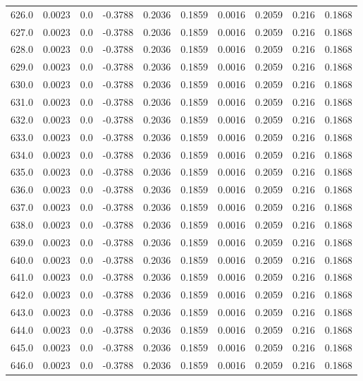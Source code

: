 \begin{longtable}{lrrrrrrrrr}
626.0 & 0.0023 & 0.0 & -0.3788 & 0.2036 & 0.1859 & 0.0016 & 0.2059 & 0.216 & 0.1868 \\
627.0 & 0.0023 & 0.0 & -0.3788 & 0.2036 & 0.1859 & 0.0016 & 0.2059 & 0.216 & 0.1868 \\
628.0 & 0.0023 & 0.0 & -0.3788 & 0.2036 & 0.1859 & 0.0016 & 0.2059 & 0.216 & 0.1868 \\
629.0 & 0.0023 & 0.0 & -0.3788 & 0.2036 & 0.1859 & 0.0016 & 0.2059 & 0.216 & 0.1868 \\
630.0 & 0.0023 & 0.0 & -0.3788 & 0.2036 & 0.1859 & 0.0016 & 0.2059 & 0.216 & 0.1868 \\
631.0 & 0.0023 & 0.0 & -0.3788 & 0.2036 & 0.1859 & 0.0016 & 0.2059 & 0.216 & 0.1868 \\
632.0 & 0.0023 & 0.0 & -0.3788 & 0.2036 & 0.1859 & 0.0016 & 0.2059 & 0.216 & 0.1868 \\
633.0 & 0.0023 & 0.0 & -0.3788 & 0.2036 & 0.1859 & 0.0016 & 0.2059 & 0.216 & 0.1868 \\
634.0 & 0.0023 & 0.0 & -0.3788 & 0.2036 & 0.1859 & 0.0016 & 0.2059 & 0.216 & 0.1868 \\
635.0 & 0.0023 & 0.0 & -0.3788 & 0.2036 & 0.1859 & 0.0016 & 0.2059 & 0.216 & 0.1868 \\
636.0 & 0.0023 & 0.0 & -0.3788 & 0.2036 & 0.1859 & 0.0016 & 0.2059 & 0.216 & 0.1868 \\
637.0 & 0.0023 & 0.0 & -0.3788 & 0.2036 & 0.1859 & 0.0016 & 0.2059 & 0.216 & 0.1868 \\
638.0 & 0.0023 & 0.0 & -0.3788 & 0.2036 & 0.1859 & 0.0016 & 0.2059 & 0.216 & 0.1868 \\
639.0 & 0.0023 & 0.0 & -0.3788 & 0.2036 & 0.1859 & 0.0016 & 0.2059 & 0.216 & 0.1868 \\
640.0 & 0.0023 & 0.0 & -0.3788 & 0.2036 & 0.1859 & 0.0016 & 0.2059 & 0.216 & 0.1868 \\
641.0 & 0.0023 & 0.0 & -0.3788 & 0.2036 & 0.1859 & 0.0016 & 0.2059 & 0.216 & 0.1868 \\
642.0 & 0.0023 & 0.0 & -0.3788 & 0.2036 & 0.1859 & 0.0016 & 0.2059 & 0.216 & 0.1868 \\
643.0 & 0.0023 & 0.0 & -0.3788 & 0.2036 & 0.1859 & 0.0016 & 0.2059 & 0.216 & 0.1868 \\
644.0 & 0.0023 & 0.0 & -0.3788 & 0.2036 & 0.1859 & 0.0016 & 0.2059 & 0.216 & 0.1868 \\
645.0 & 0.0023 & 0.0 & -0.3788 & 0.2036 & 0.1859 & 0.0016 & 0.2059 & 0.216 & 0.1868 \\
646.0 & 0.0023 & 0.0 & -0.3788 & 0.2036 & 0.1859 & 0.0016 & 0.2059 & 0.216 & 0.1868 \\

\end{longtable}
